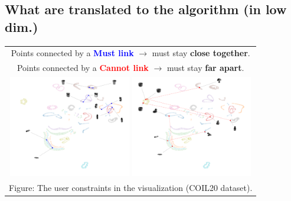 \documentclass[portrait,final,a0paper]{nadiposter}
\begin{document}
\begin{poster}
{\begin{multicols}{2}
    \section*{\large{What are translated to the algorithm (in low dim.)}}
    \noindent
    \begin{center}
    \begin{tabular}{c}
        Points connected by a \textcolor{blue}{\textbf{Must link}} $\rightarrow$ must stay \textbf{close together}.\\
        Points connected by a \textcolor{red}{\textbf{Cannot link}} $\rightarrow$ must stay \textbf{far apart}.\\
        \includegraphics[height=12em]{poster_NADI_2018/images/example_constrains_COIL20_ML.pdf}
        \includegraphics[height=12em]{poster_NADI_2018/images/example_constrains_COIL20_CL.pdf}\\
        \tiny{Figure: The user constraints in the visualization (COIL20 dataset).}
    \end{tabular}
    \end{center}
\end{multicols}
}


\end{poster}
\end{document}
